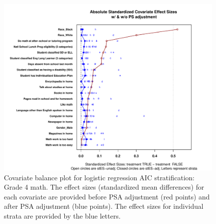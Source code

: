 \begin{figure}[h!]
\begin{center}
\includegraphics[width=\textwidth]{../Figures2009/g4math-lrAIC-balance.pdf}
\caption[Covariate balance plot for logistic regression AIC stratification: Grade 4 math]{Covariate balance plot for logistic regression AIC stratification: Grade 4 math. The effect sizes (standardized mean differences) for each covariate are provided before PSA adjustment (red points) and after PSA adjustment (blue points). The effect sizes for individual strata are provided by the blue letters.}
\end{center}
\end{figure}

